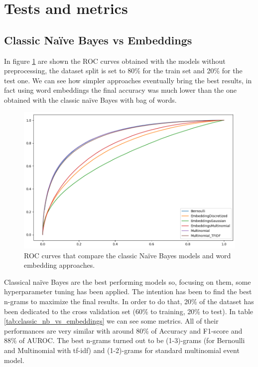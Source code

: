 \section*{Tests and metrics}

\subsection*{Classic Na\"ive Bayes vs Embeddings}

In figure \ref{fig:classic_nb_vs_embeddings} are shown the ROC curves obtained with the models without preprocessing, the dataset split is set to 80\% for the train set and 20\% for the test one.
We can see how simpler approaches eventually bring the best results, in fact using word embeddings the final accuracy was much lower than the one obtained with the classic na\"ive Bayes with bag of words. 

\begin{figure}[h!t]
    \centering
    \includegraphics[scale=0.50]{../experiments/plots/classic_nb_vs_embeddings}
    \caption{ROC curves that compare the classic Na\"ive Bayes models and
    word embedding approaches.}
    \label{fig:classic_nb_vs_embeddings}        
\end{figure}

Classical na\"ive Bayes are the best performing models so, focusing on them, some hyperparameter tuning has been applied. The intention has been to find the best n-grams to maximize the final results. In order to do that, 20\% of the dataset has been dedicated to the cross validation set (60\% to training, 20\% to test).
In table \ref{tab:classic_nb_vs_embeddings} we can see some metrics. 
All of their performances are very similar with around 80\% of Accuracy and F1-score and 88\% of AUROC. The best n-grams turned out to be (1-3)-grams (for Bernoulli and Multinomial with tf-idf) and (1-2)-grams for standard multinomial event model.

